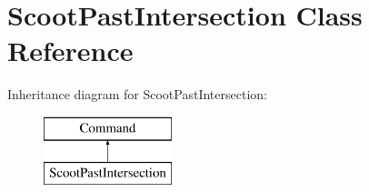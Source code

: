\hypertarget{classScootPastIntersection}{\section{Scoot\-Past\-Intersection Class Reference}
\label{classScootPastIntersection}
}
Inheritance diagram for Scoot\-Past\-Intersection\-:\begin{figure}[H]
\begin{center}
\leavevmode
\includegraphics[height=2.000000cm]{classScootPastIntersection}
\end{center}
\end{figure}
